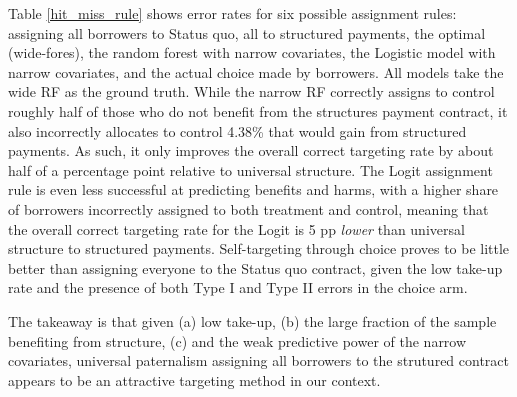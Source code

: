 \begin{appendix}

Table \ref{hit_miss_rule} shows error rates for six possible assignment rules: assigning all borrowers to Status quo, all to structured payments, the optimal (wide-fores), the random forest with narrow covariates, the Logistic model with narrow covariates, and the actual choice made by borrowers.  All models take the wide RF as the ground truth. While the narrow RF correctly assigns to control roughly half of those who do not benefit from the structures payment contract, it also incorrectly allocates to control 4.38\%  that would gain from structured payments. As such, it only improves the overall correct targeting rate by about half of a percentage point relative to universal structure. The Logit assignment rule is even less successful at predicting benefits and harms, with a higher share of borrowers incorrectly assigned to both treatment and control, meaning that the overall correct targeting rate for the Logit is 5 pp \textit{lower} than universal structure to structured payments.  Self-targeting through choice proves to be little better than assigning everyone to the Status quo contract, given the low take-up rate and the presence of both Type I and Type II errors in the choice arm.  

The takeaway is that given (a) low take-up, (b) the large fraction of the sample benefiting from structure, (c) and the weak predictive power of the narrow covariates, universal paternalism assigning all borrowers to the strutured contract appears to be an attractive targeting method in our context.


\end{appendix}
